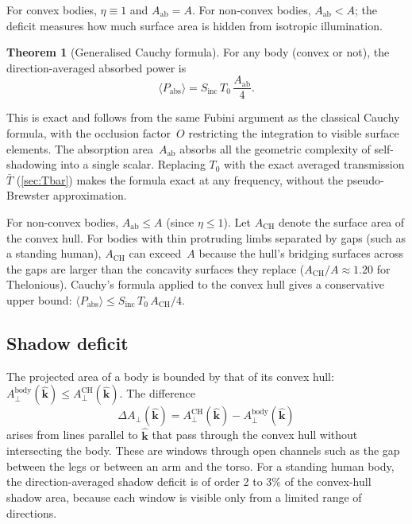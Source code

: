 \documentclass[11pt,a4paper]{article}
\theoremstyle{definition}      %
\newtheorem{theorem}{Theorem}[section]
\newcommand{\khat}{\hat{\bm{k}}}
\newcommand{\Sinc}{S_{\mathrm{inc}}}
\newcommand{\Aab}{A_{\mathrm{ab}}}
\newcommand{\Aperp}{A_{\perp}}
\newcommand{\Tbar}{\bar{T}}
\begin{document}
For convex bodies, $\eta\equiv 1$ and $\Aab=A$.  For non-convex
bodies, $\Aab < A$; the deficit measures how much surface area is
hidden from isotropic illumination.

\begin{theorem}[Generalised Cauchy formula]\label{thm:gen-cauchy}
For any body (convex or not), the direction-averaged absorbed power is
\begin{equation}\label{eq:gen-cauchy}
  \boxed{\langle P_{\mathrm{abs}}\rangle
    = \Sinc\,T_0\,\frac{\Aab}{4}.}
\end{equation}
\end{theorem}

This is exact and follows from the same Fubini argument as the
classical Cauchy formula, with the occlusion factor~$O$ restricting
the integration to visible surface elements.  The absorption
area~$\Aab$ absorbs all the geometric complexity of self-shadowing
into a single scalar.  Replacing $T_0$ with the exact averaged
transmission $\Tbar$ (\cref{sec:Tbar}) makes the formula exact at
any frequency, without the pseudo-Brewster approximation.

For non-convex bodies, $\Aab\le A$ (since $\eta\le 1$).
Let $A_{\mathrm{CH}}$ denote the surface area of the convex hull.
For bodies with thin protruding limbs separated by gaps (such as
a standing human), $A_{\mathrm{CH}}$ can exceed~$A$ because the
hull's bridging surfaces across the gaps are larger than the
concavity surfaces they replace ($A_{\mathrm{CH}}/A\approx 1.20$
for Thelonious).  Cauchy's formula applied to the convex hull gives
a conservative upper bound:
$\langle P_{\mathrm{abs}}\rangle \le \Sinc\,T_0\,A_{\mathrm{CH}}/4$.

\subsection{Shadow deficit}\label{sec:shadow-deficit}

The projected area of a body is bounded by that of its convex hull:
$\Aperp^{\mathrm{body}}(\khat)\le\Aperp^{\mathrm{CH}}(\khat)$.  The
difference
\begin{equation}
  \Delta\Aperp(\khat)
  = \Aperp^{\mathrm{CH}}(\khat) - \Aperp^{\mathrm{body}}(\khat)
\end{equation}
arises from lines parallel to $\khat$ that pass through the convex
hull without intersecting the body. These are windows through open
channels such as the gap between the legs or between an arm and the
torso.  For a standing human body, the direction-averaged shadow
deficit is of order 2 to 3\% of the convex-hull shadow area, because
each window is visible only from a limited range of directions.
\end{document}

